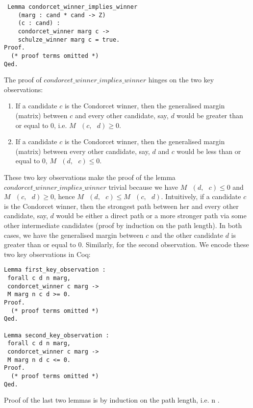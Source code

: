 \documentclass[compsoc,conference,a4paper,10pt,times]{IEEEtran}
\begin{document}
\begin{verbatim}
 Lemma condorcet_winner_implies_winner 
    (marg : cand * cand -> Z)
    (c : cand) : 
    condorcet_winner marg c -> 
    schulze_winner marg c = true. 
Proof.
  (* proof terms omitted *)
Qed.
\end{verbatim}

  		
 The proof of $condorcet\_winner\_implies\_winner$ hinges on the two key observations:
 
 \begin{enumerate}
  \item If a candidate $c$ is the Condorcet winner, then the generalised margin (matrix) 
  between $c$
  and every other candidate, say, $d$ would be greater than or equal to 0, i.e. 
  $M \text{ } (c, \text{ }d) \geq 0$.
  
  \item If a candidate $c$ is the Condorcet winner, then the generalised margin  (matrix)
  between every other candidate, say, $d$ and $c$ would be less than or equal to 0, 
  $M \text{ } (d, \text{ }c) \leq 0$.
 \end{enumerate}
 
 
 These two key observations make the proof of the lemma $condorcet\_winner\_implies\_winner$ 
 trivial because we have $M \text{ } (d, \text{ }c) \leq 0$  and
  $M \text{ } (c, \text{ }d) \geq 0$, hence $M \text{ } (d, \text{ }c)  \leq 
   M \text{ } (c, \text{ }d)$. Intuitively, 
 if a candidate $c$ is the Condorcet winner, then the strongest path between her and every other 
 candidate, say, $d$ would be either a direct path or a more stronger path 
 via some other intermediate candidates (proof by induction on the path length). 
 In both cases, we have the generalised margin between 
 $c$ and the other candidate $d$ is greater than or equal to 0. 
 Similarly, for the second observation. We encode these two key observations in 
 Coq:
 
 \begin{verbatim}
Lemma first_key_observation : 
 forall c d n marg, 
 condorcet_winner c marg -> 
 M marg n c d >= 0.
Proof.
  (* proof terms omitted *)
Qed.

Lemma second_key_observation : 
 forall c d n marg, 
 condorcet_winner c marg -> 
 M marg n d c <= 0.
Proof.
  (* proof terms omitted *)
Qed. 
 \end{verbatim}

Proof of the last two lemmas is by induction on the path length, i.e. n \cite{Carre:1971:ANR}. 
\end{document}
